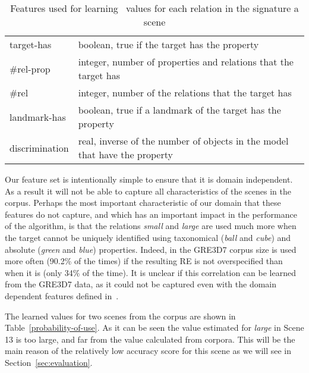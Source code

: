 \begin{small}
\begin{table}[h!]
\begin{center}
\begin{tabular}{|l|p{10cm}|} 
\hline
\small target-has     & \small boolean, true if the target has the property \\
\small \#rel-prop     & \small integer, number of properties and relations that the target has\\
\small \#rel          & \small integer, number of the relations that the target has \\
\small landmark-has   & \small boolean, true if a landmark of the target has the property\\
\small discrimination & \small real,  inverse of the number of objects in the model that have the property \\
\hline
\end{tabular}
\caption{Features used for learning \puse\ values for each relation in the signature a scene}\label{features}
\end{center}
\end{table}
\end{small}

Our feature set is intentionally simple to ensure that it is domain independent. 
As a result it will not be able to capture all characteristics of the scenes in the corpus. 
Perhaps the most important characteristic of our domain that these features do not capture, 
and which has an important impact in the performance of the algorithm, is that the relations 
\emph{small} and \emph{large} are used much more when the target cannot be uniquely identified 
using taxonomical (\emph{ball} and \emph{cube}) and absolute (\emph{green} and \emph{blue}) properties. 
Indeed, in the GRE3D7 corpus size is used more often (90.2\% of the times) if the resulting 
RE is not overspecified than when it is (only 34\% of the time). It is unclear if this correlation 
can be learned from the GRE3D7 data, as it could not be captured even with the domain dependent 
features defined in~\cite[Chapter 6]{viet:gene11}. 

The learned values for two scenes from the corpus are shown in Table~\ref{probability-of-use}.  As it can be seen 
the value estimated for \emph{large} in Scene 13 is too large, and far from the value calculated from corpora. This
will be the main reason of the relatively low accuracy score for this scene as we will see in Section~\ref{sec:evaluation}. 


